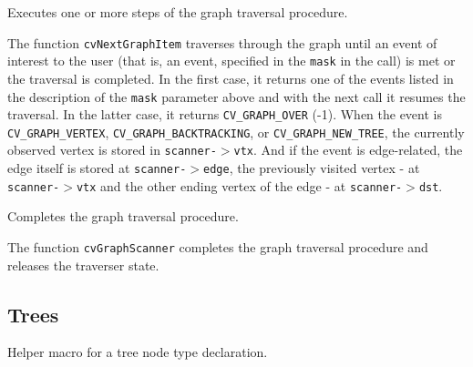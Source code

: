 \label{NextGraphItem}

Executes one or more steps of the graph traversal procedure.


\begin{description}
\end{description}

The function \texttt{cvNextGraphItem} traverses through the graph
until an event of interest to the user (that is, an event, specified
in the \texttt{mask} in the  call) is met or the
traversal is completed. In the first case, it returns one of the events
listed in the description of the \texttt{mask} parameter above and with
the next call it resumes the traversal. In the latter case, it returns
\texttt{CV\_GRAPH\_OVER} (-1). When the event is \texttt{CV\_GRAPH\_VERTEX},
\texttt{CV\_GRAPH\_BACKTRACKING}, or \texttt{CV\_GRAPH\_NEW\_TREE},
the currently observed vertex is stored in \texttt{scanner-$>$vtx}. And if the
event is edge-related, the edge itself is stored at \texttt{scanner-$>$edge},
the previously visited vertex - at \texttt{scanner-$>$vtx} and the other ending
vertex of the edge - at \texttt{scanner-$>$dst}.

\label{ReleaseGraphScanner}

Completes the graph traversal procedure.


\begin{description}
\end{description}


The function \texttt{cvGraphScanner} completes the graph traversal procedure and releases the traverser state.


\subsection{Trees}


\label{CV_TREE_NODE_FIELDS}

Helper macro for a tree node type declaration.

